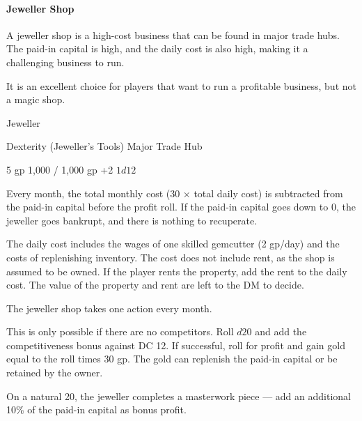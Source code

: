 \documentclass[twocolumn]{dndbook}
\begin{document}
\paragraph{Jeweller Shop}

A jeweller shop is a high-cost business that can be found in major trade hubs.
The paid-in capital is high, and the daily cost is also high,
making it a challenging business to run.\par

It is an excellent choice for players that want to run a profitable business,
but not a magic shop.

\begin{DndMonster}[width=.5\textwidth - 8pt]{Jeweller}

	\hfill Dexterity (Jeweller's Tools)
	\hfill Major Trade Hub

	\hfill 5 gp
	\hfill 1,000 / 1,000 gp
	\hfill +2
	\hfill $1d12$

	Every month, the total monthly cost (30 × total daily cost) is subtracted
	from the paid-in capital before the profit roll.
	If the paid-in capital goes down to 0, the jeweller goes bankrupt,
	and there is nothing to recuperate.\par

	The daily cost includes the wages of one skilled gemcutter (2 gp/day)
	and the costs of replenishing inventory.
	The cost does not include rent, as the shop is assumed to be owned.
	If the player rents the property, add the rent to the daily cost.
	The value of the property and rent are left to the DM to decide.\par

	The jeweller shop takes one action every month.

	This is only possible if there are no competitors.
	Roll $d20$ and add the competitiveness bonus against DC 12.
	If successful, roll for profit and gain gold equal to the roll
	times 30 gp. The gold can replenish the paid-in capital or be retained by the owner.\par
	On a natural 20, the jeweller completes a masterwork piece — add an additional 10\% of the paid-in capital as bonus profit.


\end{DndMonster}
\end{document}
